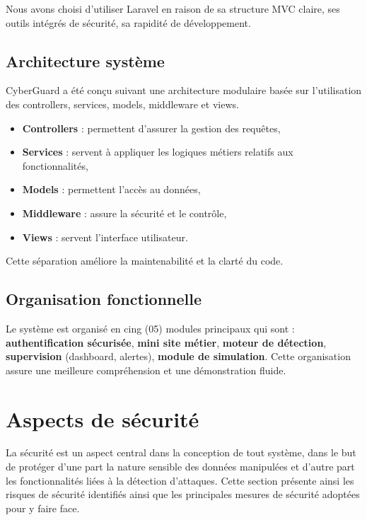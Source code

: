\documentclass[a4paper,12pt]{report}
\begin{document}
    Nous avons choisi d'utiliser Laravel en raison de sa structure MVC claire, ses outils intégrés de sécurité, sa rapidité de développement.
    
    \subsection{Architecture système}
        
    CyberGuard a été conçu suivant une architecture modulaire basée sur l'utilisation des controllers, services, models, middleware et views.
    
    \begin{itemize}
        \item \textbf{Controllers} : permettent d'assurer la gestion des requêtes,
        \item \textbf{Services} : servent à appliquer les logiques métiers relatifs aux fonctionnalités,
        \item \textbf{Models} : permettent l'accès au données,
        \item \textbf{Middleware} : assure la sécurité et le contrôle,
        \item \textbf{Views} : servent l'interface utilisateur.
    \end{itemize}
    
     Cette séparation améliore la maintenabilité et la clarté du code.
    
    \subsection{Organisation fonctionnelle}
    
    Le système est organisé en cing (05) modules principaux qui sont : \textbf{authentification sécurisée}, \textbf{mini site métier}, \textbf{moteur de détection}, \textbf{supervision} (dashboard, alertes), \textbf{module de simulation}. Cette organisation assure une meilleure compréhension et une démonstration fluide.
    
    \section{Aspects de sécurité}
    
    La sécurité est un aspect central dans la conception de tout système, dans le but de protéger d'une part la nature sensible des données manipulées et d'autre part les fonctionnalités liées à la détection d'attaques. Cette section présente ainsi les risques de sécurité identifiés ainsi que les principales mesures de sécurité adoptées pour y faire face.
    
\end{document}
